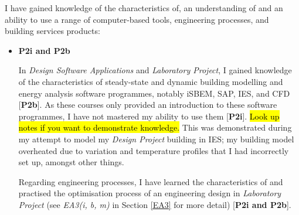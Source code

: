 I have gained knowledge of the characteristics of, an understanding of and an ability to use a range of computer-based tools, engineering processes, and building services products:
\begin{itemize}
     
    
    \item \textbf{P2i and P2b}
    
    In \textit{Design Software Applications} and \textit{Laboratory Project}, I gained knowledge of the characteristics of steady-state and dynamic building modelling and energy analysis software programmes, notably iSBEM, SAP, IES, and CFD [\textbf{P2b}].
    As these courses only provided an introduction to these software programmes, I have not mastered my ability to use them [\textbf{P2i}].
    \hl{Look up} \DSATitle \space \hl{notes if you want to demonstrate knowledge.}
    This was demonstrated during my attempt to model my \textit{Design Project} building in IES; my building model overheated due to variation and temperature profiles that I had incorrectly set up, amongst other things.
    
    
    Regarding engineering processes, 
    I have learned the characteristics of and practised the optimisation process of an engineering design in \textit{Laboratory Project} (see \textit{EA3(i, b, m)} in Section \ref{EA3} for more detail) [\textbf{P2i and P2b}].
    

\end{itemize}
